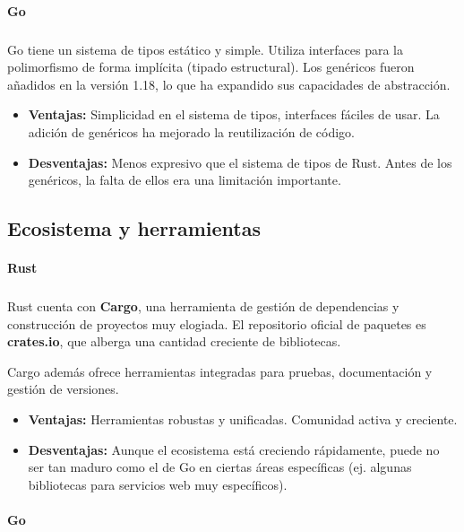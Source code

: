 \paragraph{Go}
\subparagraph{}

Go tiene un sistema de tipos estático y simple. Utiliza interfaces para la polimorfismo de forma implícita (tipado estructural). Los genéricos fueron añadidos en la versión 1.18, lo que ha expandido sus capacidades de abstracción.
\begin{itemize}
    \item \textbf{Ventajas:} Simplicidad en el sistema de tipos, interfaces fáciles de usar. La adición de genéricos ha mejorado la reutilización de código.
    \item \textbf{Desventajas:} Menos expresivo que el sistema de tipos de Rust. Antes de los genéricos, la falta de ellos era una limitación importante.
\end{itemize}

\subsection{Ecosistema y herramientas}
\paragraph{Rust}
\subparagraph{}

Rust cuenta con \textbf{Cargo}, una herramienta de gestión de dependencias y construcción de proyectos muy elogiada. El repositorio oficial de paquetes es \textbf{crates.io}, que alberga una cantidad creciente de bibliotecas.

Cargo además ofrece herramientas integradas para pruebas, documentación y gestión de versiones.
\begin{itemize}
    \item \textbf{Ventajas:} Herramientas robustas y unificadas. Comunidad activa y creciente.
    \item \textbf{Desventajas:} Aunque el ecosistema está creciendo rápidamente, puede no ser tan maduro como el de Go en ciertas áreas específicas (ej. algunas bibliotecas para servicios web muy específicos).
\end{itemize}

\paragraph{Go}
\subparagraph{}

